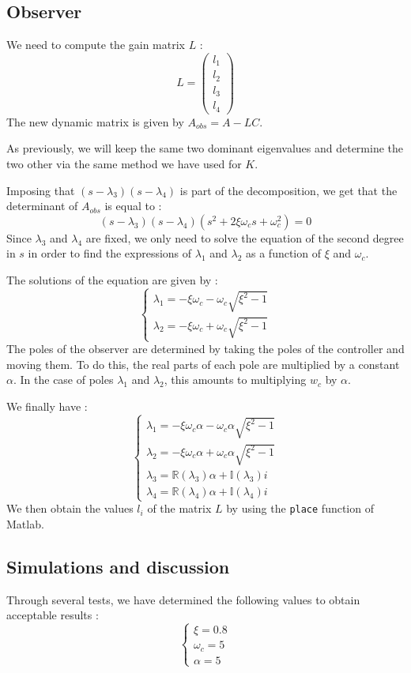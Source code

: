 \subsection{Observer}
We need to compute the gain matrix $L$ :
$$
L = \begin{pmatrix}
    l_1\\
    l_2\\
    l_3\\
    l_4
\end{pmatrix}
$$
The new dynamic matrix is given by $A_{obs} = A - LC$.\par
As previously, we will keep the same two dominant eigenvalues and determine the two other via the same method we have used for $K$.\par
Imposing that $(s - \lambda_3)(s - \lambda_4)$ is part of the decomposition, we get that the determinant of $A_{obs}$ is equal to :
$$
(s - \lambda_3)(s - \lambda_4)(s^2 + 2 \xi\omega_c s + \omega_c^2) = 0
$$
Since $\lambda_3$ and $\lambda_4$ are fixed, we only need to solve the equation of the second degree in $s$ in order to find the expressions of $\lambda_1$ and $\lambda_2$ as a function of $\xi$ and $\omega_c$.\par
The solutions of the equation are given by :
$$
\begin{cases}
    \lambda_1 = -\xi\omega_c - \omega_c\sqrt{\xi^2 - 1}\\
    \lambda_2 = -\xi\omega_c + \omega_c\sqrt{\xi^2 - 1}
\end{cases}
$$
The poles of the observer are determined by taking the poles of the controller and moving them. To do this, the real parts of each pole are multiplied by a constant $\alpha$. In the case of poles $\lambda_1$ and $\lambda_2$, this amounts to multiplying $w_c$ by $\alpha$.\par
We finally have :
$$
\begin{cases}
    \lambda_1 = -\xi\omega_c\alpha - \omega_c\alpha\sqrt{\xi^2 - 1}\\
    \lambda_2 = -\xi\omega_c\alpha + \omega_c\alpha\sqrt{\xi^2 - 1}\\
    \lambda_3 = \mathbb{R}(\lambda_3)\alpha + \mathbb{I}(\lambda_3)i\\
    \lambda_4 = \mathbb{R}(\lambda_4)\alpha + \mathbb{I}(\lambda_4)i
\end{cases}
$$
We then obtain the values $l_i$ of the matrix $L$ by using the \texttt{place} function of Matlab.

\subsection{Simulations and discussion}
Through several tests, we have determined the following values to obtain acceptable results :
$$
\begin{cases}
    \xi = 0.8\\
    \omega_c = 5\\
    \alpha = 5
\end{cases}
$$
